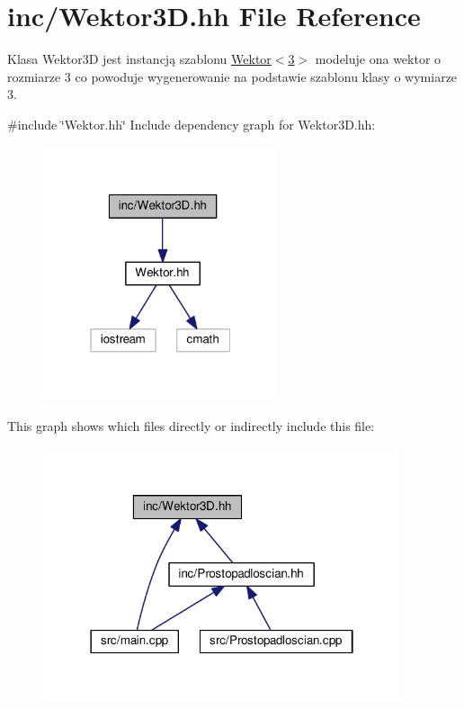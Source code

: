 \hypertarget{Wektor3D_8hh}{}\section{inc/\+Wektor3D.hh File Reference}
\label{Wektor3D_8hh}


Klasa Wektor3D jest instancją szablonu \hyperlink{classWektor}{Wektor$<$3$>$} modeluje ona wektor o rozmiarze 3 co powoduje wygenerowanie na podstawie szablonu klasy o wymiarze 3.  


{\ttfamily \#include \char`\"{}Wektor.\+hh\char`\"{}}\newline
Include dependency graph for Wektor3\+D.\+hh\+:\nopagebreak
\begin{figure}[H]
\begin{center}
\leavevmode
\includegraphics[width=196pt]{Wektor3D_8hh__incl}
\end{center}
\end{figure}
This graph shows which files directly or indirectly include this file\+:\nopagebreak
\begin{figure}[H]
\begin{center}
\leavevmode
\includegraphics[width=298pt]{Wektor3D_8hh__dep__incl}
\end{center}
\end{figure}
